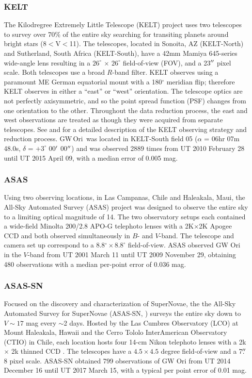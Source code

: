 \documentclass[twocolumn]{aastex61}
\newcommand{\obj}{GW\,Ori}
\begin{document}
\subsubsection{KELT}
The Kilodregree Extremely Little Telescope (KELT) project uses two telescopes to survey over 70\% of the entire sky searching for transiting planets around bright stars (8$<$V$<$11). The telescopes, located in Sonoita, AZ (KELT-North) and Sutherland, South Africa (KELT-South), have a 42mm Mamiya 645-series wide-angle lens resulting in a $26^{\circ}$ $\times$ $26^{\circ}$ field-of-view (FOV), and a 23$\mbox{$^{\prime\prime}$}$ pixel scale. Both telescopes use a broad $R$-band filter. KELT observes using a paramount ME German equatorial mount with a 180$^{\circ}$ meridian flip; therefore KELT observes in either a ``east'' or ``west'' orientation. The telescope optics are not perfectly axisymmetric, and so the point spread function (PSF) changes from one orientation to the other. Throughout the data reduction process, the east and west observations are treated as though they were acquired from separate telescopes. See \citet{Siverd12} and \citet{Kuhn16} for a detailed description of the KELT observing strategy and reduction process. \obj\ was located in KELT-South field 05 ($\alpha$ =  06hr 07m 48.0s, $\delta$ = $+3^{\circ}$ 00$\mbox{$^\prime$}$ 00$\mbox{$^{\prime\prime}$}$) and was observed 2889 times from UT 2010 February 28 until UT 2015 April 09, with a median error of 0.005 mag.

\subsubsection{ASAS}
Using two observing locations, in Las Campanas, Chile and Haleakala, Maui, the All-Sky Automated Survey (ASAS) project was designed to observe the entire sky to a limiting optical magnitude of 14. The two observatory setups each contained a wide-field Minolta 200/2.8 APO-G telephoto lenses with a 2K$\times$2K Apogee CCD and both observed simultaneously in $B$- and $V$-band. The telescope and camera set up correspond to a 8.8$^{\circ}\times8.8^{\circ}$ field-of-view. ASAS observed GW Ori in the $V$-band from UT 2001 March 11 until UT 2009 November 29, obtaining 480 observations with a median per-point error of 0.036 mag.

\subsubsection{ASAS-SN}
Focused on the discovery and characterization of SuperNovae, the the All-Sky Automated Survey for SuperNovae (ASAS-SN, \citet{Shappee14}) surveys the entire sky down to $V \sim 17$ mag every $\sim$2 days. Hosted by the Las Cumbres Observatory (LCO) at Mount Haleakala, Hawaii and the Cerro Tololo InterAmerican Observatory (CTIO) in Chile, each location hosts four 14-cm Nikon telephoto lenses with a 2k $\times$ 2k thinned CCD \citep{Brown13}. The telescopes have a $4.5\times4.5$ degree field-of-view and a 7$\mbox{$.\!\!^{\prime\prime}$}$8 pixel scale. ASAS-SN obtained 799 observations of GW Ori from UT 2014 December 16 until UT 2017 March 15, with a typical per point error of 0.01 mag.
\end{document}
